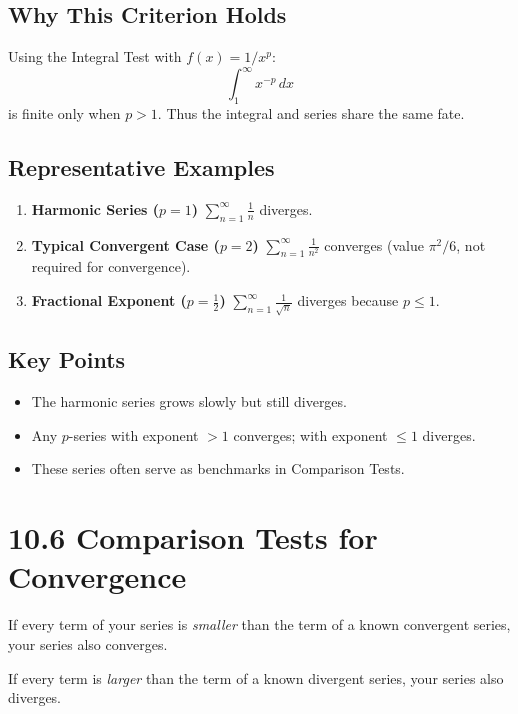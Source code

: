 \documentclass{article}
\begin{document}
\subsection*{Why This Criterion Holds}
Using the Integral Test with \(f(x)=1/x^{p}\):
\[
\int_{1}^{\infty} x^{-p}\,dx
\]
is finite only when \(p>1\).
Thus the integral and series share the same fate.

\subsection*{Representative Examples}

\begin{enumerate}[label=\textbf{\arabic*.},itemsep=8pt]

  \item \textbf{Harmonic Series (\(p=1\))}
        \(\displaystyle\sum_{n=1}^{\infty}\frac{1}{n}\) diverges.

  \item \textbf{Typical Convergent Case (\(p=2\))}
        \(\displaystyle\sum_{n=1}^{\infty}\frac{1}{n^{2}}\) converges
        (value \(\pi^{2}/6\), not required for convergence).

  \item \textbf{Fractional Exponent (\(p=\tfrac12\))}
        \(\displaystyle\sum_{n=1}^{\infty}\frac{1}{\sqrt{n}}\) diverges because \(p\le1\).

\end{enumerate}

\subsection*{Key Points}
\begin{itemize}[itemsep=4pt]
  \item The harmonic series grows slowly but still diverges.
  \item Any \(p\)-series with exponent \(>1\) converges; with exponent \(\le1\) diverges.
  \item These series often serve as benchmarks in Comparison Tests.
\end{itemize}

\newpage
\section{10.6  Comparison Tests for Convergence}

\begin{tcolorbox}[colback=gray!8,colframe=black,title=Direct Comparison]
If every term of your series is \emph{smaller} than the term of a
known convergent series, your series also converges.

If every term is \emph{larger} than the term of a known divergent series,
your series also diverges.
\end{tcolorbox}
\end{document}
